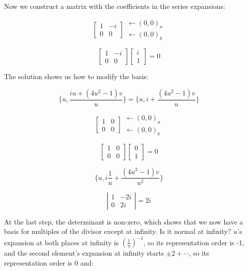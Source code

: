 Now we construct a matrix with the coefficients in the series expansions:

$$\left[ \begin{array}{cc} 1 & -i \\ 0 & 0 \end{array} \right] \begin{array}{ll} \leftarrow (0,0)_a \\ \leftarrow (0,0)_b \end{array} $$

$$\left[ \begin{array}{cc} 1 & -i \\ 0 & 0 \end{array} \right] \left[ \begin{array}{c} i \\ 1 \end{array} \right] = 0$$

The solution shows us how to modify the basis:

$$\{u, \frac{iu + (4u^2-1)v}{u}\} = \{u, i + \frac{(4u^2-1)v}{u}\}$$

$$\left[ \begin{array}{cc} 1 & 0 \\ 0 & 0 \end{array} \right] \begin{array}{ll} \leftarrow (0,0)_a \\ \leftarrow (0,0)_b \end{array} $$

$$\left[ \begin{array}{cc} 1 & 0 \\ 0 & 0 \end{array} \right] \left[ \begin{array}{c} 0 \\ 1 \end{array} \right] = 0$$

$$\{u, i\frac{1}{u} + \frac{(4u^2-1)v}{u^2}\}$$

$$\left| \begin{array}{cc} 1 & -2i \\ 0 & 2i \end{array} \right| = 2i$$

At the last step, the determinant is non-zero, which shows that we
now have a basis for multiples of the divisor except at infinity.
Is it normal at infinity?  $u$'s expansion at both places at infinity
is $\left(\frac{1}{u}\right)^{-1}$, so its representation order is -1,
and the second element's expansion at infinity starts $\pm 2 + \cdots$,
so its representation order is 0 and:

